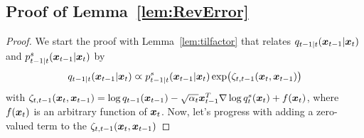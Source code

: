 \subsection{Proof of Lemma~\ref{lem:RevError}}\label{proof:lemReverror}
\begin{proof}

 
We start the proof with Lemma~\ref{lem:tilfactor} that relates $\Fdd_{t-1|t}(\x_{t-1}|\x_t)$ and $\Bdd^s_{t-1|t}(\x_{t-1}|\x_t)$  by
\begin{align}
  \Fdd_{t-1|t}(\x_{t-1}|\x_t)  \varpropto \Bdds_{t-1|t}(\x_{t-1}|\x_t)\exp\bigl( \zeta_{t,t-1}(\x_t,\x_{t-1})\bigr)
\end{align}
with $\zeta_{t,t-1}(\x_t,\x_{t-1})= \log \Fdd_{t-1}(\x_{t-1})-\sqrt{\alpha_t}\x_{t-1}^T\nabla \log \Fdds_t(\x_t)+f(\x_t)$, where $f(\x_t)$ is an arbitrary function of $\x_t$.
Now, let's progress with adding a zero-valued term to the $\zeta_{t,t-1}(\x_t,\x_{t-1})$ 


\end{proof}
